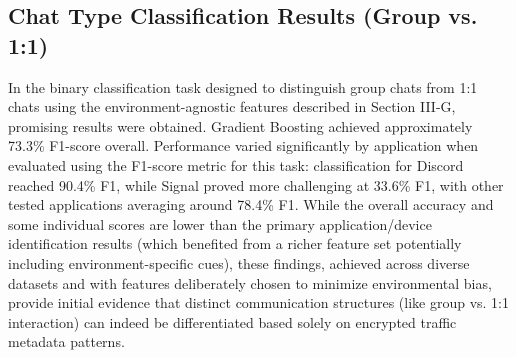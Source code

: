 \documentclass[conference]{IEEEtran}
\begin{document}
\begin{table*}[!ht]
\centering
\caption{Group vs 1:1 user action classification for each IMA app for \textbf{Gradient Boosting}}
\label{tab:MLDevresults} 
\end{table*}




\subsection{Chat Type Classification Results (Group vs. 1:1)}

In the binary classification task designed to distinguish group chats from 1:1 chats using the environment-agnostic features described in Section III-G, promising results were obtained. Gradient Boosting achieved approximately 73.3\% F1-score overall. Performance varied significantly by application when evaluated using the F1-score metric for this task: classification for Discord reached 90.4\% F1, while Signal proved more challenging at 33.6\% F1, with other tested applications averaging around 78.4\% F1. While the overall accuracy and some individual scores are lower than the primary application/device identification results (which benefited from a richer feature set potentially including environment-specific cues), these findings, achieved across diverse datasets and with features deliberately chosen to minimize environmental bias, provide initial evidence that distinct communication structures (like group vs. 1:1 interaction) can indeed be differentiated based solely on encrypted traffic metadata patterns.
\end{document}
